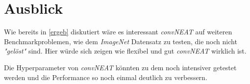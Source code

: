 \documentclass[]{scrartcl}
\begin{document}
		
	\section{Ausblick}

		Wie bereits in \ref{ergeb} diskutiert wäre es interessant \textit{convNEAT} auf weiteren Benchmarkproblemen, wie dem \textit{ImageNet} Datensatz zu testen,
		die noch nicht \textit{"gelöst"} sind. Hier würde sich zeigen wie flexibel und gut \textit{convNEAT} wirklich ist.

		Die Hyperparameter von \textit{convNEAT} könnten zu dem noch intensiver getestet werden und die Performance so noch einmal deutlich zu verbessern.

\clearpage

\printbibliography[heading=bibintoc, title={References}]
\end{document}

